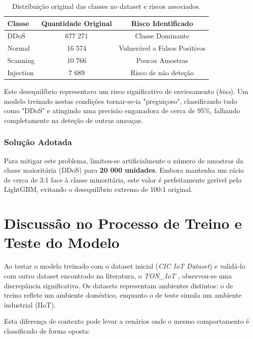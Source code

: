\documentclass[12pt,a4paper]{article}
\begin{document}
\begin{table}[h]
    \centering
    \begin{tabular}{|l|c|c|}
        \hline
        \textbf{\textcolor{ubiBlue}{Classe}} & \textbf{\textcolor{ubiBlue}{Quantidade Original}} & \textbf{\textcolor{ubiBlue}{Risco Identificado}} \\
        \hline
        DDoS & 677 271 & Classe Dominante \\
        Normal & 16 574 & Vulnerável a Falsos Positivos \\
        Scanning & 10 766 & Poucas Amostras \\
        Injection & 7 689 & Risco de não deteção \\
        \hline
    \end{tabular}
    \caption{Distribuição original das classes no dataset e riscos associados.}
    \label{tab:distribuicao}
\end{table}

\noindent Este desequilíbrio representava um risco significativo de enviesamento (\textit{bias}). Um modelo treinado nestas condições tornar-se-ia "preguiçoso", classificando tudo como "DDoS" e atingindo uma precisão enganadora de cerca de 95\%, falhando completamente na deteção de outras ameaças.

\subsubsection{Solução Adotada}
Para mitigar este problema, limitou-se artificialmente o número de amostras da classe maioritária (DDoS) para \textbf{20 000 unidades}. Embora mantenha um rácio de cerca de 3:1 face à classe minoritária, este valor é perfeitamente gerível pelo LightGBM, evitando o desequilíbrio extremo de 100:1 original.

\section{Discussão no Processo de Treino e Teste do Modelo}

Ao testar o modelo treinado com o dataset inicial (\textit{CIC IoT Dataset}) e validá-lo com outro dataset encontrado na literatura, o \textit{TON\_IoT} \cite{ton_iot_dataset}, observou-se uma discrepância significativa. Os datasets representam ambientes distintos: o de treino reflete um ambiente doméstico, enquanto o de teste simula um ambiente industrial (IIoT).

Esta diferença de contexto pode levar a cenários onde o mesmo comportamento é classificado de forma oposta:
\end{document}
